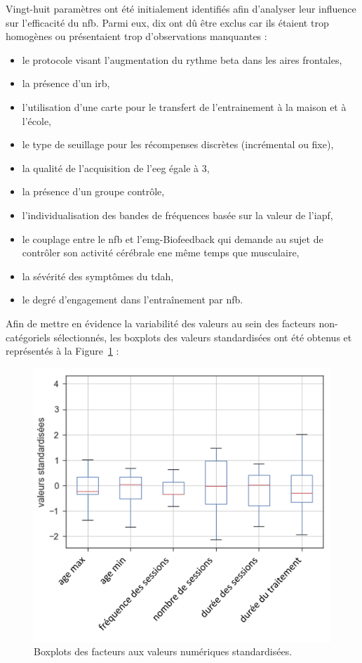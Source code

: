 Vingt-huit paramètres ont été initialement identifiés afin d'analyser leur influence sur l'efficacité du \gls{nfb}. Parmi eux, dix ont dû être exclus car ils étaient trop
homogènes ou présentaient trop d'observations manquantes : 
\begin{itemize}
	\item le protocole visant l'augmentation du rythme beta dans les aires frontales,
	\item la présence d'un \gls{irb},
  \item l'utilisation d'une carte pour le transfert de l'entrainement à la maison et à l'école, 
  \item le type de seuillage pour les récompenses discrètes (incrémental ou fixe),
  \item la qualité de l'acquisition de l'\gls{eeg} égale à 3,
	\item la présence d'un groupe contrôle,
	\item l'individualisation des bandes de fréquences basée sur la valeur de l'\gls{iapf},
	\item le couplage entre le \gls{nfb} et l'\gls{emg}-Biofeedback qui demande au sujet de contrôler son activité cérébrale ene même temps que musculaire,
	\item la sévérité des symptômes du \gls{tdah},
	\item le degré d'engagement dans l'entraînement par \gls{nfb}.
\end{itemize} 

Afin de mettre en évidence la variabilité des valeurs au sein des facteurs non-catégoriels sélectionnés, les boxplots des valeurs standardisées ont 
été obtenus et représentés à la Figure~\ref{Figure:factors-boxplots} :
\begin{figure}[h!]
  \centering
	\includegraphics[width=0.7\linewidth]{figures/chapter-3/factors-distribution-of-factors} 
  \caption{Boxplots des facteurs aux valeurs numériques standardisées.} 
  \label{Figure:factors-boxplots}
\end{figure}

